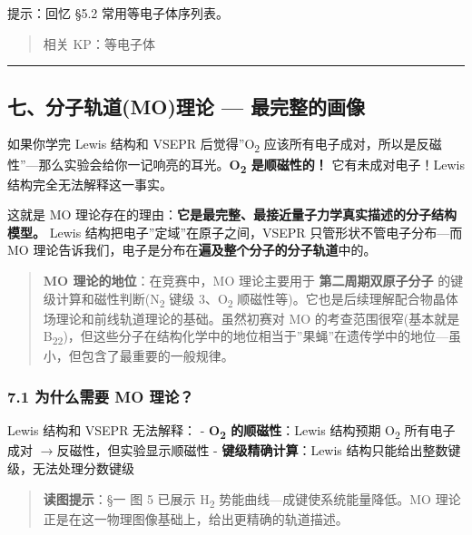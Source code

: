 \documentclass[a4paper,11pt]{ctexart}
\newcommand{\箭}{\ensuremath{\rightarrow}}
\newcommand{\左箭}{\ensuremath{\leftarrow}}
\newcommand{\上箭}{\ensuremath{\uparrow}}
\newcommand{\下箭}{\ensuremath{\downarrow}}
\newcommand{\衡}{\ensuremath{\rightleftharpoons}}
\newcommand{\双箭}{\ensuremath{\leftrightarrow}}
\newcommand{\约等于}{\ensuremath{\approx}}
\newcommand{\小于等于}{\ensuremath{\leq}}
\newcommand{\大于等于}{\ensuremath{\geq}}
\newcommand{\不等于}{\ensuremath{\neq}}
\newcommand{\西格马}{\ensuremath{\sigma}}
\newcommand{\派}{\ensuremath{\pi}}
\begin{document}
提示：回忆 §5.2 常用等电子体序列表。

\begin{quote}
相关 KP：等电子体
\end{quote}

\begin{center}\rule{0.5\linewidth}{0.5pt}\end{center}

\subsection{七、分子轨道(MO)理论 --- 最完整的画像}\label{ux4e03ux5206ux5b50ux8f68ux9053moux7406ux8bba-ux6700ux5b8cux6574ux7684ux753bux50cf}

如果你学完 Lewis 结构和 VSEPR 后觉得''O\textsubscript{2} 应该所有电子成对，所以是反磁性''---那么实验会给你一记响亮的耳光。\textbf{O\textsubscript{2} 是顺磁性的！} 它有未成对电子！Lewis 结构完全无法解释这一事实。

这就是 MO 理论存在的理由：\textbf{它是最完整、最接近量子力学真实描述的分子结构模型。} Lewis 结构把电子''定域''在原子之间，VSEPR 只管形状不管电子分布---而 MO 理论告诉我们，电子是分布在\textbf{遍及整个分子的分子轨道}中的。

\begin{quote}
\textbf{MO 理论的地位}：在竞赛中，MO 理论主要用于 \textbf{第二周期双原子分子} 的键级计算和磁性判断(N\textsubscript{2} 键级 3、O\textsubscript{2} 顺磁性等)。它也是后续理解配合物晶体场理论和前线轨道理论的基础。虽然初赛对 MO 的考查范围很窄(基本就是 B\textsubscript{2}\textsubscript{2})，但这些分子在结构化学中的地位相当于''果蝇''在遗传学中的地位---虽小，但包含了最重要的一般规律。
\end{quote}

\subsubsection{7.1 为什么需要 MO 理论？}\label{ux4e3aux4ec0ux4e48ux9700ux8981-mo-ux7406ux8bba}

Lewis 结构和 VSEPR 无法解释：
- \textbf{O\textsubscript{2} 的顺磁性}：Lewis 结构预期 O\textsubscript{2} 所有电子成对 \箭 反磁性，但实验显示顺磁性
- \textbf{键级精确计算}：Lewis 结构只能给出整数键级，无法处理分数键级

\begin{quote}
\textbf{读图提示}：§一 图 5 已展示 H\textsubscript{2} 势能曲线---成键使系统能量降低。MO 理论正是在这一物理图像基础上，给出更精确的轨道描述。
\end{quote}
\end{document}
